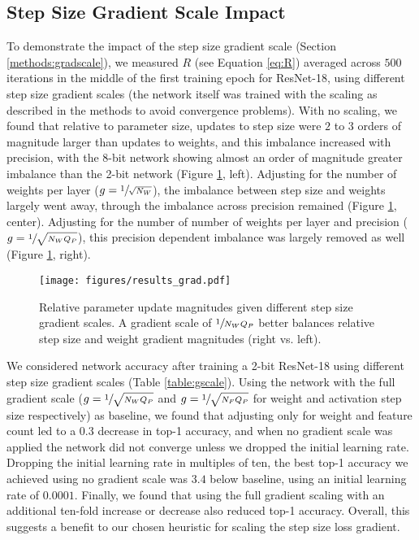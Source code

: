 \documentclass{article}
\begin{document}
\subsection{Step Size Gradient Scale Impact}
\label{sec:gradscaleres}

To demonstrate the impact of the step size gradient scale (Section \ref{methods:gradscale}), we measured $R$ (see Equation \ref{eq:R}) averaged across $500$ iterations in the middle of the first training epoch for ResNet-18,
using different step size gradient scales (the network itself was trained with the scaling as described in the methods to avoid convergence problems).
With no scaling, we found that relative to parameter size, updates to step size were $2$ to $3$ orders of magnitude larger than updates to weights, and this imbalance increased with precision, with the 8-bit network showing almost an order of magnitude greater imbalance than the 2-bit network (Figure \ref{fig:results_grad}, left). Adjusting for the number of weights per layer ($g=\sfrac{1}{\sqrt{N_W}}$), the imbalance between step size and weights largely went away, through the imbalance across precision remained (Figure \ref{fig:results_grad}, center).
Adjusting for the number of number of weights per layer and precision ($g=\sfrac{1}{\sqrt{N_WQ_P}}$), this precision dependent imbalance was largely removed as well (Figure \ref{fig:results_grad}, right).
 
\begin{figure}[ht]
\begin{center}
  	\centerline{\texttt{[image: figures/results\_grad.pdf]}}
  \caption{
	Relative parameter update magnitudes given different step size gradient scales.  A gradient scale of $\sfrac{1}{N_WQ_P}$ better balances relative step size and weight gradient magnitudes (right vs. left).
}
    	\label{fig:results_grad}
  	\end{center}
\end{figure}

We considered network accuracy after training a 2-bit ResNet-18 using different step size gradient scales (Table \ref{table:gscale}).
Using the network with the full gradient scale ($g=\sfrac{1}{\sqrt{N_WQ_P}}$ and $g=\sfrac{1}{\sqrt{N_FQ_P}}$ for weight and activation step size respectively) as baseline, we found that adjusting only for weight and feature count led to a $0.3$ decrease in top-1 accuracy, and when no gradient scale was applied the network did not converge unless we dropped the initial learning rate.
Dropping the initial learning rate in multiples of ten, the best top-1 accuracy we achieved using no gradient scale was $3.4$ below baseline, using an initial learning rate of $0.0001$.
Finally, we found that using the full gradient scaling with an additional ten-fold increase or decrease also reduced top-1 accuracy.
Overall, this suggests a benefit to our chosen heuristic for scaling the step size loss gradient.
\end{document}

